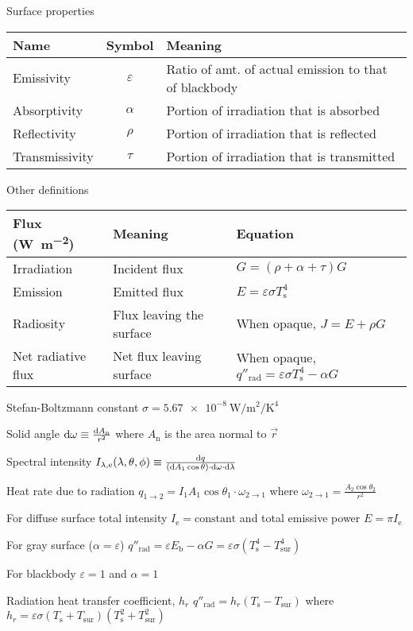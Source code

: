 \documentclass{article}
\begin{document}
\begin{description*}
  \item[Surface properties]
    \begin{tabu}{lcl}
      \toprule
      Name & Symbol & Meaning \\
      \midrule
      Emissivity & $\varepsilon$ & Ratio of amt. of actual emission to that of blackbody \\
      Absorptivity & $\alpha$ & Portion of irradiation that is absorbed \\
      Reflectivity & $\rho$ & Portion of irradiation that is reflected \\
      Transmissivity & $\tau$ & Portion of irradiation that is transmitted \\
      \bottomrule
    \end{tabu}
  \item[Other definitions]
    \begin{tabu}{lll}
      \toprule
      Flux (\si{\watt\per\square\meter}) & Meaning & Equation \\
      \midrule
      Irradiation & Incident flux & \(G = (\rho+\alpha+\tau)G\) \\
      Emission & Emitted flux & \(E = \varepsilon\sigma{}T^4_\mathrm{s}\) \\
      Radiosity & Flux leaving the surface & When opaque, \(J = E + \rho{}G\)\\
      Net radiative flux & Net flux leaving surface & When opaque,
      \(q''_\mathrm{rad} = \varepsilon\sigma{}T^4_\mathrm{s}-\alpha{}G\) \\
      \bottomrule
    \end{tabu}
  \item[Stefan-Boltzmann constant]
    \(\sigma = \SI{5.67e-8}{\watt\per\square\meter\per\kelvin\tothe{4}}\)
  \item[Solid angle]
    \(\dif{\omega} \equiv \frac{\dif{A_\mathrm{n}}}{r^2}\) where
    $A_\mathrm{n}$ is the area normal to $\vec{r}$
  \item[Spectral intensity]
    \(I_{\lambda,\mathrm{e}}(\lambda,\theta,\phi)
    \equiv \frac{\dif q}{(\dif{A_1}\cos\theta)\cdot\dif{\omega}\cdot\dif{\lambda}}\)
  \item[Heat rate due to radiation]
    \(q_{1\rightarrow2} = I_1A_1\cos\theta_1 \cdot \omega_{2\rightarrow1}\) where
    \(\omega_{2\rightarrow1} = \frac{A_2\cos\theta_2}{r^2}\)
  \item[For diffuse surface]
    total intensity \(I_\mathrm{e} = \textrm{constant}\) and
    total emissive power \(E = \pi{}I_\mathrm{e}\)
  \item[For gray surface ($\alpha=\varepsilon$)]
    \(q''_\mathrm{rad} = \varepsilon E_\mathrm{b} - \alpha G
    = \varepsilon\sigma(T_\mathrm{s}^4-T_\mathrm{sur}^4)\)
  \item[For blackbody] $\varepsilon=1$ and $\alpha=1$
  \item[Radiation heat transfer coefficient, $h_r$]
    \(q''_\mathrm{rad} = h_r(T_\mathrm{s}-T_\mathrm{sur})\) where
    \(h_r = \varepsilon\sigma(T_\mathrm{s}+T_\mathrm{sur})(T_\mathrm{s}^2+T_\mathrm{sur}^2)\)
\end{description*}
\end{document}
